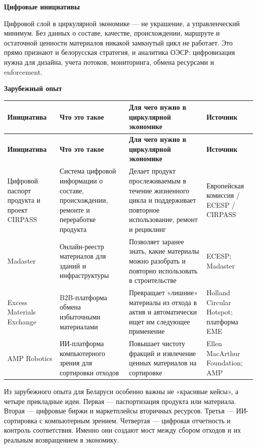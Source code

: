 \documentclass[14pt,a4paper]{extarticle}
\begin{document}
\textbf{Цифровые инициативы}

Цифровой слой в циркулярной экономике --- не украшение, а управленческий минимум. Без данных о составе, качестве, происхождении, маршруте и остаточной ценности материалов никакой замкнутый цикл не работает. Это прямо признают и белорусская стратегия, и аналитика ОЭСР: цифровизация нужна для дизайна, учета потоков, мониторинга, обмена ресурсами и enforcement.

\textbf{Зарубежный опыт}

\begin{longtable}{>{\raggedright\arraybackslash}p{2.8cm}>{\raggedright\arraybackslash}p{3.2cm}>{\raggedright\arraybackslash}p{4.2cm}>{\raggedright\arraybackslash}p{2.2cm}}
\toprule
\textbf{Инициатива} & \textbf{Что это такое} & \textbf{Для чего нужно в циркулярной экономике} & \textbf{Источник} \\
\midrule
\endfirsthead
\toprule
\textbf{Инициатива} & \textbf{Что это такое} & \textbf{Для чего нужно в циркулярной экономике} & \textbf{Источник} \\
\midrule
\endhead
Цифровой паспорт продукта и проект CIRPASS & Система цифровой информации о составе, происхождении, ремонте и переработке продукта & Делает продукт прослеживаемым в течение жизненного цикла и поддерживает повторное использование, ремонт и рециклинг & Европейская комиссия / ECESP / CIRPASS \\
Madaster & Онлайн-реестр материалов для зданий и инфраструктуры & Позволяет заранее знать, какие материалы можно разобрать и повторно использовать в строительстве & ECESP; Madaster \\
Excess Materials Exchange & B2B-платформа обмена избыточными материалами & Превращает «лишние» материалы из отхода в актив и автоматически ищет им следующее применение & Holland Circular Hotspot; платформа EME \\
AMP Robotics & ИИ-платформа компьютерного зрения для сортировки отходов & Повышает чистоту фракций и извлечение ценных материалов на сортировке & Ellen MacArthur Foundation; AMP \\
\bottomrule
\end{longtable}

Из зарубежного опыта для Беларуси особенно важны не «красивые кейсы», а четыре прикладные идеи. Первая --- паспортизация продукта или материала. Вторая --- цифровые биржи и маркетплейсы вторичных ресурсов. Третья --- ИИ-сортировка с компьютерным зрением. Четвертая --- цифровая отчетность и контроль соответствия. Именно они создают мост между сбором отходов и их реальным возвращением в экономику.
\end{document}
